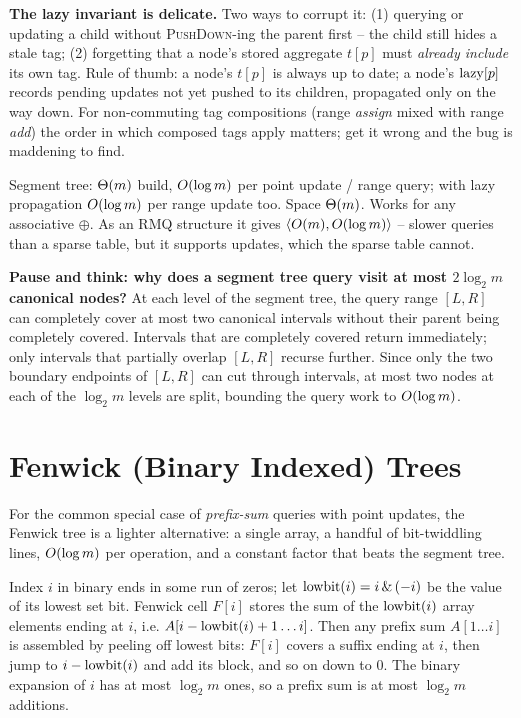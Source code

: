 \begin{trapbox}
\textbf{The lazy invariant is delicate.} Two ways to corrupt it: (1) querying or updating a
child without \textsc{PushDown}-ing the parent first -- the child still hides a stale tag;
(2) forgetting that a node's stored aggregate $t[p]$ must \emph{already include} its own tag.
Rule of thumb: a node's $t[p]$ is always up to date; a node's $\mathrm{lazy}[p]$ records pending updates
not yet pushed to its children, propagated only on the way down. For non-commuting tag compositions (range \emph{assign}
mixed with range \emph{add}) the order in which composed tags apply matters; get it wrong and
the bug is maddening to find.
\end{trapbox}

\begin{complexitybox}
Segment tree: $\Theta(m)$ build, $O(\log m)$ per point update / range query; with lazy
propagation $O(\log m)$ per range update too. Space $\Theta(m)$. Works for any associative
$\oplus$. As an RMQ structure it gives $\langle O(m),O(\log m)\rangle$ -- slower queries
than a sparse table, but it supports updates, which the sparse table cannot.
\end{complexitybox}

\begin{recoverybox}
\textbf{Pause and think: why does a segment tree query visit at most $2\log_2 m$ canonical nodes?}
At each level of the segment tree, the query range $[L, R]$ can completely cover at most two canonical intervals without their parent being completely covered. Intervals that are completely covered return immediately; only intervals that partially overlap $[L, R]$ recurse further. Since only the two boundary endpoints of $[L, R]$ can cut through intervals, at most two nodes at each of the $\log_2 m$ levels are split, bounding the query work to $O(\log m)$.
\end{recoverybox}

\section{Fenwick (Binary Indexed) Trees}
\label{ch23:fenwick}

For the common special case of \emph{prefix-sum} queries with point updates, the Fenwick
tree is a lighter alternative: a single array, a handful of bit-twiddling lines,
$O(\log m)$ per operation, and a constant factor that beats the segment tree.

\begin{intuitionbox}
Index $i$ in binary ends in some run of zeros; let $\operatorname{lowbit}(i)=i\,\&\,(-i)$ be the value of
its lowest set bit. Fenwick cell $F[i]$ stores the sum of the $\operatorname{lowbit}(i)$ array elements
ending at $i$, i.e. $A[i-\operatorname{lowbit}(i)+1\ldots i]$. Then any prefix sum $A[1\ldots i]$ is
assembled by peeling off lowest bits: $F[i]$ covers a suffix ending at $i$, then jump to
$i-\operatorname{lowbit}(i)$ and add its block, and so on down to $0$. The binary expansion of $i$ has at
most $\log_2 m$ ones, so a prefix sum is at most $\log_2 m$ additions.
\end{intuitionbox}

